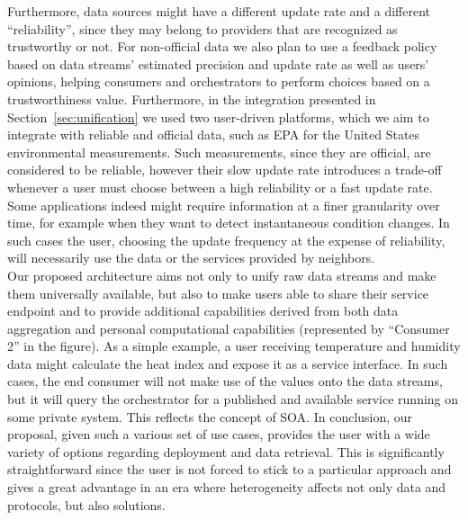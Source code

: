 Furthermore, data sources might have a different update rate and a different ``reliability'', since they may belong to providers that are recognized as trustworthy or not.
For non-official data we also plan to use a feedback policy based on data streams' estimated precision and update rate as well as users' opinions, helping consumers and orchestrators to perform choices based on a trustworthiness value. 
Furthermore, in the integration presented in Section~\ref{sec:unification} we used two user-driven platforms, which we aim to integrate with reliable and official data, such as EPA for the United States environmental measurements.
Such measurements, since they are official, are considered to be reliable, however their slow update rate introduces a trade-off whenever a user must choose between a high reliability or a fast update rate.
Some applications indeed might require information at a finer granularity over time, for example when they want to detect instantaneous condition changes.
In such cases the user, choosing the update frequency at the expense of reliability, will necessarily use the data or the services provided by neighbors.
\\

Our proposed architecture aims not only to unify raw data streams and make them universally available, but also to make users able to share their service endpoint and to provide additional capabilities derived from both data aggregation and personal computational capabilities (represented by ``Consumer 2'' in the figure).
As a simple example, a user receiving temperature and humidity data might calculate the heat index and expose it as a service interface.
In such cases, the end consumer will not make use of the values onto the data streams, but it will query the orchestrator for a published and available service running on some private system.
This reflects the concept of SOA.
In conclusion, our proposal, given such a various set of use cases, provides the user with a wide variety of options regarding deployment and data retrieval.
This is significantly straightforward since the user is not forced to stick to a particular approach and gives a great advantage in an era where heterogeneity affects not only data and protocols, but also solutions.